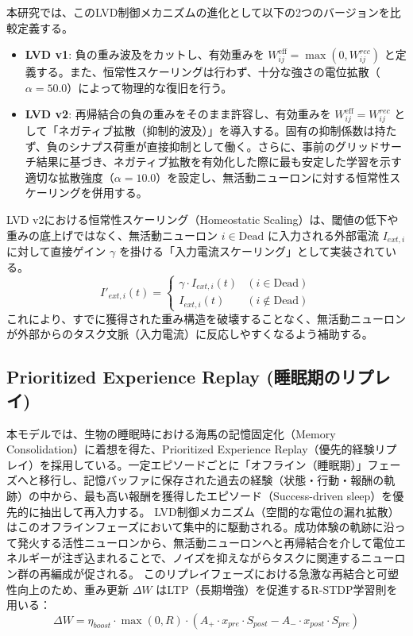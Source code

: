 \documentclass[submit]{ipsj}
\begin{document}
本研究では、このLVD制御メカニズムの進化として以下の2つのバージョンを比較定義する。
\begin{itemize}
    \item \textbf{LVD v1}: 負の重み波及をカットし、有効重みを $W_{ij}^{\text{eff}} = \max(0, W_{ij}^{rec})$ と定義する。また、恒常性スケーリングは行わず、十分な強さの電位拡散（$\alpha=50.0$）によって物理的な復旧を行う。
    \item \textbf{LVD v2}: 再帰結合の負の重みをそのまま許容し、有効重みを $W_{ij}^{\text{eff}} = W_{ij}^{rec}$ として「ネガティブ拡散（抑制的波及）」を導入する。固有の抑制係数は持たず、負のシナプス荷重が直接抑制として働く。さらに、事前のグリッドサーチ結果に基づき、ネガティブ拡散を有効化した際に最も安定した学習を示す適切な拡散強度（$\alpha=10.0$）を設定し、無活動ニューロンに対する恒常性スケーリングを併用する。
\end{itemize}

LVD v2における恒常性スケーリング（Homeostatic Scaling）は、閾値の低下や重みの底上げではなく、無活動ニューロン $i \in \text{Dead}$ に入力される外部電流 $I_{ext,i}$ に対して直接ゲイン $\gamma$ を掛ける「入力電流スケーリング」として実装されている。
\begin{equation}
I'_{ext,i}(t) = 
\begin{cases} 
\gamma \cdot I_{ext,i}(t) & (i \in \text{Dead}) \\
I_{ext,i}(t) & (i \notin \text{Dead})
\end{cases}
\end{equation}
これにより、すでに獲得された重み構造を破壊することなく、無活動ニューロンが外部からのタスク文脈（入力電流）に反応しやすくなるよう補助する。

\subsection{Prioritized Experience Replay (睡眠期のリプレイ)}
本モデルでは、生物の睡眠時における海馬の記憶固定化（Memory Consolidation）に着想を得た、Prioritized Experience Replay（優先的経験リプレイ）を採用している。一定エピソードごとに「オフライン（睡眠期）」フェーズへと移行し、記憶バッファに保存された過去の経験（状態・行動・報酬の軌跡）の中から、最も高い報酬を獲得したエピソード（Success-driven sleep）を優先的に抽出して再入力する。
LVD制御メカニズム（空間的な電位の漏れ拡散）はこのオフラインフェーズにおいて集中的に駆動される。成功体験の軌跡に沿って発火する活性ニューロンから、無活動ニューロンへと再帰結合を介して電位エネルギーが注ぎ込まれることで、ノイズを抑えながらタスクに関連するニューロン群の再編成が促される。
このリプレイフェーズにおける急激な再結合と可塑性向上のため、重み更新 $\Delta W$ はLTP（長期増強）を促進するR-STDP学習則\cite{izhikevich2007solving,bing2020indirect}を用いる：
\begin{equation}
\Delta W = \eta_{boost} \cdot \max(0, R) \cdot (A_+ \cdot x_{pre} \cdot S_{post} - A_- \cdot x_{post} \cdot S_{pre})
\end{equation}
\end{document}

